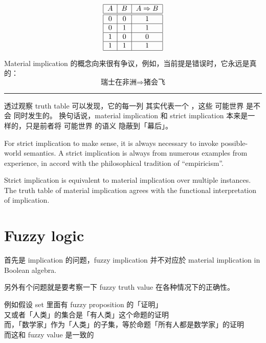 \begin{equation}
\label{eqn:implication-truth-table}
\begin{tabular}{|c|c|c|}
\hline 
$A$ & $B$ & $A \Rightarrow B$ \\ 
\hline \hline 
0 & 0 & 1 \\
\hline 
0 & 1 & 1 \\ 
\hline 
1 & 0 & 0 \\ 
\hline 
1 & 1 & 1 \\ 
\hline 
\end{tabular} 
\end{equation}

Material implication 的概念向来很有争议，例如，当前提是错误时，它永远是真的： 
\begin{equation}
\mbox{瑞士在非洲} \Rightarrow \mbox{猪会飞}
\end{equation}

\begin{center}
\rule{0.8\textwidth}{1pt}
\end{center}

透过观察 truth table 可以发现，它的每一列 其实代表一个 ，这些 可能世界 是不会 同时发生的。 换句话说，material implication 和 strict implication 本来是一样的，只是前者将 可能世界 的语义 隐蔽到「幕后」。 

For strict implication to make sense, it is always necessary to invoke possible-world semantics.  A strict implication is always  from numerous examples from experience, in accord with the philosophical tradition of ``empiricism''.

Strict implication is equivalent to material implication over multiple instances.  The truth table of material implication agrees with the functional interpretation of implication.  

\section{Fuzzy logic}

首先是 implication 的问题，fuzzy implication 并不对应於 material implication in Boolean algebra.

另外有个问题就是要考察一下 fuzzy truth value 在各种情况下的正确性。 

例如假设 set 里面有 fuzzy proposition 的「证明」\\
又或者「人类」的集合是「有人类」这个命题的证明 \\
而，「数学家」作为「人类」的子集，等於命题「所有人都是数学家」的证明 \\
而这和 fuzzy value 是一致的

